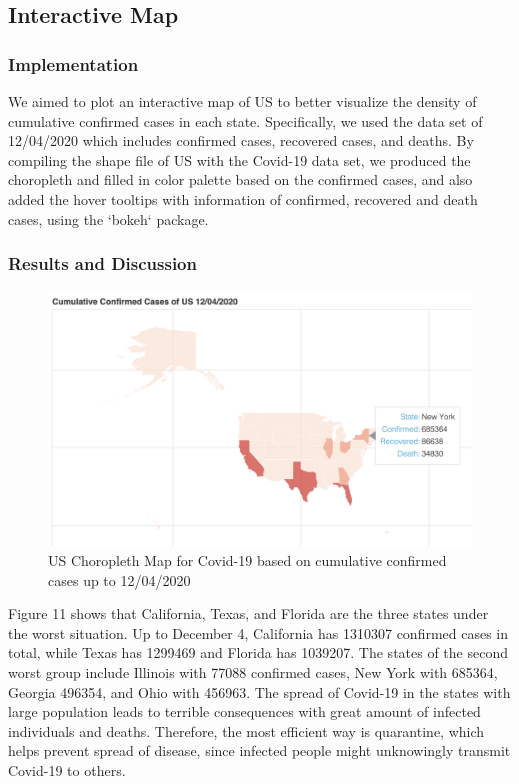 \documentclass{article}
\begin{document}
\subsection{Interactive Map}


\subsubsection{Implementation}

We aimed to plot an interactive map of US to better visualize the density of cumulative confirmed cases in each state. Specifically, we used the data set of 12/04/2020 which includes confirmed cases, recovered cases, and deaths. By compiling the shape file of US with the Covid-19 data set, we produced the choropleth and filled in color palette based on the confirmed cases, and also added the hover tooltips with information of confirmed, recovered and death cases, using the `bokeh` package. 




\subsubsection{Results and Discussion}

\begin{figure}[htp]

\centering
\includegraphics[width=.6\textwidth]{map.png}

\caption{US Choropleth Map for Covid-19 based on cumulative confirmed cases up to 12/04/2020}
\label{fig:figure}
\end{figure}
\FloatBarrier

\noindent
Figure 11 shows that California, Texas, and Florida are the three states under the worst situation. Up to December 4, California has 1310307 confirmed cases in total, while Texas has 1299469 and Florida has 1039207. The states of the second worst group include Illinois with 77088 confirmed cases, New York with 685364, Georgia 496354, and Ohio with 456963. The spread of Covid-19 in the states with large population leads to terrible consequences with great amount of infected individuals and deaths. Therefore, the most efficient way is quarantine, which helps prevent spread of disease, since infected people might unknowingly transmit Covid-19 to others. 
\end{document}
